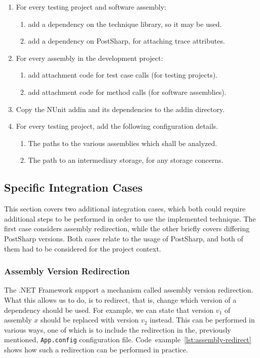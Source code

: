 \documentclass[a4paper,english,12pt]{report}
\newcommand{\textcf}{\texttt}
\begin{document}
\begin{enumerate}
  \item For every testing project and software assembly:
  \begin{enumerate}
    \item add a dependency on the technique library, so it may be used.
    \item add a dependency on PostSharp, for attaching trace attributes.
  \end{enumerate}
  \item For every assembly in the development project:
  \begin{enumerate}
    \item add attachment code for test case calls (for testing projects).
    \item add attachment code for method calls (for software assemblies).
  \end{enumerate}
  \item Copy the NUnit addin and its dependencies to the addin directory.
  \item For every testing project, add the following configuration details.
  \begin{enumerate}
    \item The paths to the various assemblies which shall be analyzed.
    \item The path to an intermediary storage, for any storage concerns.
  \end{enumerate}
\end{enumerate}

\subsection{Specific Integration Cases}\label{sec:specific-integration-cases}
This section covers two additional integration cases, which both could require additional steps to be performed in order to use the implemented technique. The first case considers assembly redirection, while the other briefly covers differing PostSharp versions. Both cases relate to the usage of PostSharp, and both of them had to be considered for the project context.

\subsubsection{Assembly Version Redirection}
The .NET Framework support a mechanism called assembly version redirection. What this allows us to do, is to redirect, that is, change which version of a dependency should be used. For example, we can state that version $v_1$ of assembly $x$ should be replaced with version $v_2$ instead. This can be performed in various ways, one of which is to include the redirection in the, previously mentioned, \textcf{App.config} configuration file. Code~example~\vref{lst:assembly-redirect} shows how such a redirection can be performed in practice. \citep{microsoft2014redirect}
\end{document}
